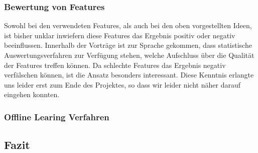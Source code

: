 \subsubsection{Bewertung von Features}	
	Sowohl bei den verwendeten Features, als auch bei den oben vorgestellten Ideen, ist bisher unklar inwiefern diese Features das Ergebnis positiv oder negativ beeinflussen. Innerhalb der Vorträge ist zur Sprache gekommen, dass statistische Auswertungsverfahren zur Verfügung stehen, welche Aufschluss über die Qualität der Features treffen können. Da schlechte Features das Ergebnis negativ verfälschen können, ist die Ansatz besonders interessant. Diese Kenntnis erlangte uns leider erst zum Ende des Projektes, so dass wir leider nicht näher darauf eingehen konnten.

\subsubsection{Offline Learing Verfahren}	
	

\subsection{Fazit}
